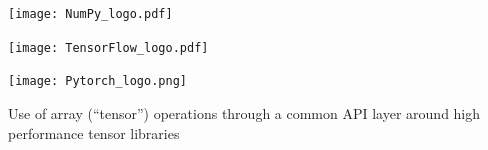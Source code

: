 \documentclass[a0paper,fleqn]{betterposter}
\begin{document}
{ %
 \vspace{0.5em}
 \begin{minipage}{0.33\textwidth}
  \begin{center}
   \texttt{[image: NumPy\_logo.pdf]}
  \end{center}
 \end{minipage}%
 \quad
 \begin{minipage}{0.33\textwidth}
  \begin{center}
   \texttt{[image: TensorFlow\_logo.pdf]}
  \end{center}
 \end{minipage}%
 \quad
 \begin{minipage}{0.33\textwidth}
  \begin{center}
   \texttt{[image: Pytorch\_logo.png]}
  \end{center}
 \end{minipage}%
 \vspace{0.5em}

 Use of array (``tensor'') operations through a common API layer around high performance tensor libraries

 \vspace{-1em}
}
\end{document}
